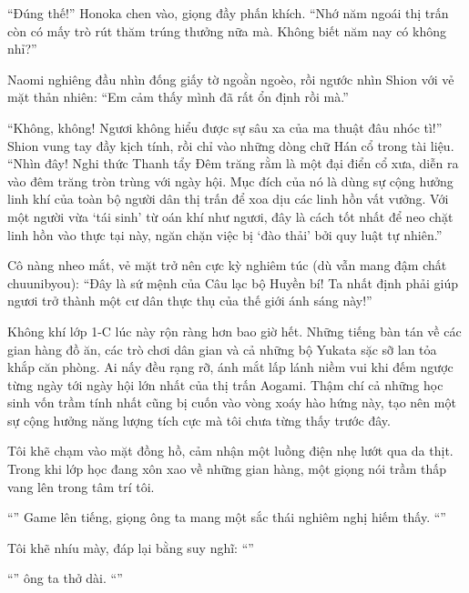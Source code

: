 \documentclass[../main.tex]{subfiles}
\begin{document}
``Đúng thế!'' Honoka chen vào, giọng đầy phấn khích. ``Nhớ năm ngoái thị trấn còn có mấy trò rút thăm trúng thưởng nữa mà. Không biết năm nay có không nhỉ?''

Naomi nghiêng đầu nhìn đống giấy tờ ngoằn ngoèo, rồi ngước nhìn Shion với vẻ mặt thản nhiên: ``Em cảm thấy mình đã rất ổn định rồi mà.''

``Không, không! Ngươi không hiểu được sự sâu xa của ma thuật đâu nhóc tì!'' Shion vung tay đầy kịch tính, rồi chỉ vào những dòng chữ Hán cổ trong tài liệu. ``Nhìn đây! Nghi thức Thanh tẩy Đêm trăng rằm là một đại điển cổ xưa, diễn ra vào đêm trăng tròn trùng với ngày hội. Mục đích của nó là dùng sự cộng hưởng linh khí của toàn bộ người dân thị trấn để xoa dịu các linh hồn vất vưởng. Với một người vừa `tái sinh' từ oán khí như ngươi, đây là cách tốt nhất để neo chặt linh hồn vào thực tại này, ngăn chặn việc bị `đào thải' bởi quy luật tự nhiên.''

Cô nàng nheo mắt, vẻ mặt trở nên cực kỳ nghiêm túc (dù vẫn mang đậm chất chuunibyou): ``Đây là sứ mệnh của Câu lạc bộ Huyền bí! Ta nhất định phải giúp ngươi trở thành một cư dân thực thụ của thế giới ánh sáng này!''

Không khí lớp 1-C lúc này rộn ràng hơn bao giờ hết. Những tiếng bàn tán về các gian hàng đồ ăn, các trò chơi dân gian và cả những bộ Yukata sặc sỡ lan tỏa khắp căn phòng. Ai nấy đều rạng rỡ, ánh mắt lấp lánh niềm vui khi đếm ngược từng ngày tới ngày hội lớn nhất của thị trấn Aogami. Thậm chí cả những học sinh vốn trầm tính nhất cũng bị cuốn vào vòng xoáy hào hứng này, tạo nên một sự cộng hưởng năng lượng tích cực mà tôi chưa từng thấy trước đây.

Tôi khẽ chạm vào mặt đồng hồ, cảm nhận một luồng điện nhẹ lướt qua da thịt. Trong khi lớp học đang xôn xao về những gian hàng, một giọng nói trầm thấp vang lên trong tâm trí tôi.

``'' Game lên tiếng, giọng ông ta mang một sắc thái nghiêm nghị hiếm thấy. ``''

Tôi khẽ nhíu mày, đáp lại bằng suy nghĩ: ``''

``'' ông ta thở dài. ``''
\end{document}
